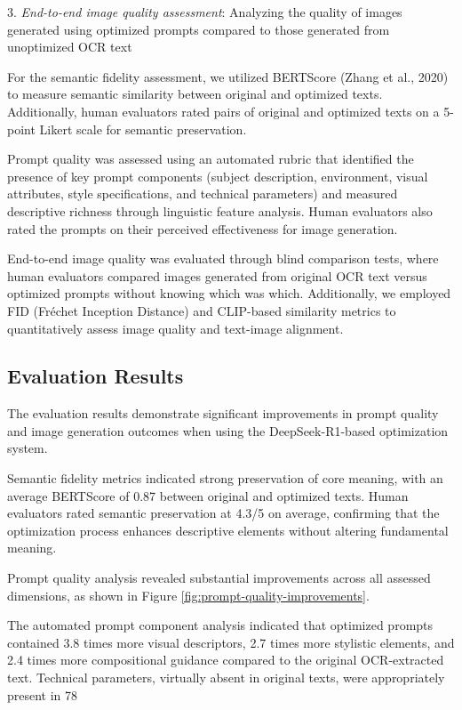 3. \textit{End-to-end image quality assessment}: Analyzing the quality of images generated using optimized prompts compared to those generated from unoptimized OCR text

For the semantic fidelity assessment, we utilized BERTScore (Zhang et al., 2020) to measure semantic similarity between original and optimized texts. Additionally, human evaluators rated pairs of original and optimized texts on a 5-point Likert scale for semantic preservation.

Prompt quality was assessed using an automated rubric that identified the presence of key prompt components (subject description, environment, visual attributes, style specifications, and technical parameters) and measured descriptive richness through linguistic feature analysis. Human evaluators also rated the prompts on their perceived effectiveness for image generation.

End-to-end image quality was evaluated through blind comparison tests, where human evaluators compared images generated from original OCR text versus optimized prompts without knowing which was which. Additionally, we employed FID (Fréchet Inception Distance) and CLIP-based similarity metrics to quantitatively assess image quality and text-image alignment.

\subsection{Evaluation Results}
\label{subsec:evaluation-results}

The evaluation results demonstrate significant improvements in prompt quality and image generation outcomes when using the DeepSeek-R1-based optimization system.

Semantic fidelity metrics indicated strong preservation of core meaning, with an average BERTScore of 0.87 between original and optimized texts. Human evaluators rated semantic preservation at 4.3/5 on average, confirming that the optimization process enhances descriptive elements without altering fundamental meaning.

Prompt quality analysis revealed substantial improvements across all assessed dimensions, as shown in Figure \ref{fig:prompt-quality-improvements}.


The automated prompt component analysis indicated that optimized prompts contained 3.8 times more visual descriptors, 2.7 times more stylistic elements, and 2.4 times more compositional guidance compared to the original OCR-extracted text. Technical parameters, virtually absent in original texts, were appropriately present in 78%

